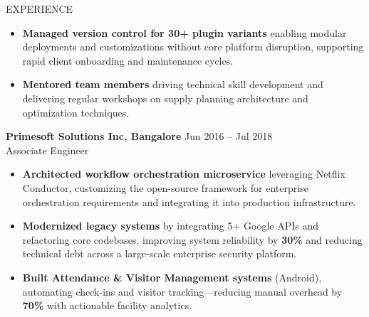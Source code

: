 \documentclass{resume} %
\begin{document}
\begin{rSection}{EXPERIENCE}
\begin{itemize}
    \item \textbf{Managed version control for 30+ plugin variants} enabling modular deployments and customizations without core platform disruption, supporting rapid client onboarding and maintenance cycles.

    \item \textbf{Mentored team members} driving technical skill development and delivering regular workshops on supply planning architecture and optimization techniques.
\end{itemize}
\vspace{1em}
\textbf{Primesoft Solutions Inc, Bangalore} \hfill Jun 2016 -- Jul 2018 \\
Associate Engineer \\
\begin{itemize}
    \item \textbf{Architected workflow orchestration microservice} leveraging Netflix Conductor, customizing the open-source framework for enterprise orchestration requirements and integrating it into production infrastructure.
    \item \textbf{Modernized legacy systems} by integrating 5+ Google APIs and refactoring core codebases, improving system reliability by \textbf{30\%} and reducing technical debt across a large-scale enterprise security platform.
    \item \textbf{Built Attendance \& Visitor Management systems} (Android), automating check-ins and visitor tracking—reducing manual overhead by \textbf{70\%} with actionable facility analytics.
\end{itemize}

\end{rSection} 
\vspace{1em}
\end{document}
